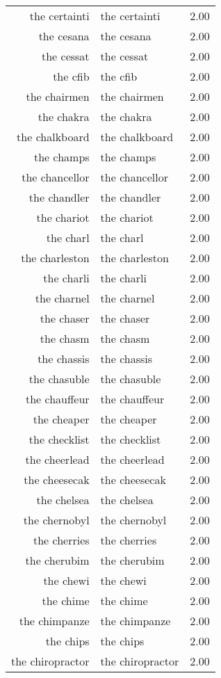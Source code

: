 \begin{table}[ht]
\begin{tabular}{rlr}
  the certainti & the certainti & 2.00 \\ 
  the cesana & the cesana & 2.00 \\ 
  the cessat & the cessat & 2.00 \\ 
  the cfib & the cfib & 2.00 \\ 
  the chairmen & the chairmen & 2.00 \\ 
  the chakra & the chakra & 2.00 \\ 
  the chalkboard & the chalkboard & 2.00 \\ 
  the champs & the champs & 2.00 \\ 
  the chancellor & the chancellor & 2.00 \\ 
  the chandler & the chandler & 2.00 \\ 
  the chariot & the chariot & 2.00 \\ 
  the charl & the charl & 2.00 \\ 
  the charleston & the charleston & 2.00 \\ 
  the charli & the charli & 2.00 \\ 
  the charnel & the charnel & 2.00 \\ 
  the chaser & the chaser & 2.00 \\ 
  the chasm & the chasm & 2.00 \\ 
  the chassis & the chassis & 2.00 \\ 
  the chasuble & the chasuble & 2.00 \\ 
  the chauffeur & the chauffeur & 2.00 \\ 
  the cheaper & the cheaper & 2.00 \\ 
  the checklist & the checklist & 2.00 \\ 
  the cheerlead & the cheerlead & 2.00 \\ 
  the cheesecak & the cheesecak & 2.00 \\ 
  the chelsea & the chelsea & 2.00 \\ 
  the chernobyl & the chernobyl & 2.00 \\ 
  the cherries & the cherries & 2.00 \\ 
  the cherubim & the cherubim & 2.00 \\ 
  the chewi & the chewi & 2.00 \\ 
  the chime & the chime & 2.00 \\ 
  the chimpanze & the chimpanze & 2.00 \\ 
  the chips & the chips & 2.00 \\ 
  the chiropractor & the chiropractor & 2.00 \\ 

\end{tabular}
\end{table}
